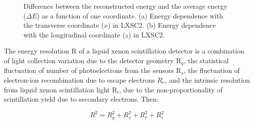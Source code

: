 \documentclass[review]{elsarticle}
\begin{document}
\begin{figure}[!htb]
	\centering		
	\caption{\label{fig.energyDep2} Difference between the reconstructed energy and the average energy ($\Delta E$) as a function of one coordinate. (a) Energy dependence with the transverse coordinate ($x$) in LXSC2. (b) Energy dependence with the longitudinal coordinate ($z$) in LXSC2.}
\end{figure}


The energy resolution R of a liquid xenon scintillation detector is a combination of light collection variation due to the detector geometry R$_g$, the statistical fluctuation of number of photoelectrons from the sensors R$_s$, the fluctuation of electron-ion recombination due to escape electrons $R_r$, and the intrinsic resolution from liquid xenon scintillation light R$_i$, due to the non-proportionality of scintillation yield due to secondary electrons. Then:

\begin{equation}
R^2 = R_g^2 + R_s^2 + R_r^2 + R_i^2
\end{equation}
\end{document}
